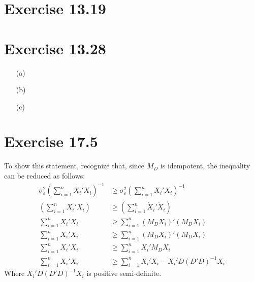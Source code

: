 \documentclass{article}
\newcommand{\eps}{\varepsilon}
\begin{document}

\section*{Exercise 13.19}


\section*{Exercise 13.28}

\begin{itemize}
	\item[(a)]
	
	\item[(b)]
	
	\item[(c)]
	
\end{itemize}


\section*{Exercise 17.5}
To show this statement, recognize that, since $M_D$ is idempotent, the inequality can be reduced as follows:
\begin{align*}
	\sigma^2_\eps\left(\sum_{i=1}^n\dot{X}_i'\dot{X}_i\right)^{-1}	&\geq \sigma^2_\eps\left(\sum_{i=1}^nX_i'X_i\right)^{-1}	\\
	\left(\sum_{i=1}^nX_i'X_i\right)								&\geq \left(\sum_{i=1}^n\dot{X}_i'\dot{X}_i\right)			\\
	\sum_{i=1}^nX_i'X_i												&\geq \sum_{i=1}^n(M_DX_i)'(M_DX_i)							\\
	\sum_{i=1}^nX_i'X_i												&\geq \sum_{i=1}^n(M_DX_i)'(M_DX_i)							\\
	\sum_{i=1}^nX_i'X_i												&\geq \sum_{i=1}^nX_i'M_DX_i								\\
	\sum_{i=1}^nX_i'X_i												&\geq \sum_{i=1}^nX_i'X_i - X_i'D(D'D)^{-1}X_i
\end{align*}
Where $X_i'D(D'D)^{-1}X_i$ is positive semi-definite.

\end{document}
